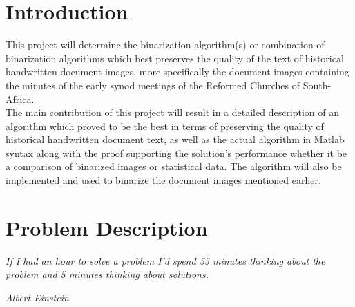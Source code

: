 \documentclass[11pt]{article}
\begin{document}
	

    \renewcommand{\cftsecleader}{\cftdotfill{\cftdotsep}} %
    \tableofcontents
    \thispagestyle{empty}
    \clearpage

    \listoffigures
    \thispagestyle{empty}
    \clearpage


    \setcounter{page}{1}

	\section{Introduction} %
		This project will determine the binarization algorithm(s) or combination of binarization algorithms which best preserves the quality of the text of historical handwritten document images, more specifically the document images containing the minutes of the early synod meetings of the Reformed Churches of South-Africa.\\

		The main contribution of this project will result in a detailed description of an algorithm which proved to be the best in terms of preserving the quality of historical handwritten document text, as well as the actual algorithm in Matlab syntax along with the proof supporting the solution's performance whether it be a comparison of binarized images or statistical data. The algorithm will also be implemented and used to binarize the document images mentioned earlier.

	\section{Problem Description} %
    		\textit{If I had an hour to solve a problem I'd spend 55 minutes thinking about the problem and 5 minutes thinking about solutions.}\\
    		[-1.25cm]
    		\begin{flushright}
    			\textit{Albert Einstein}
		\end{flushright}
\end{document}
